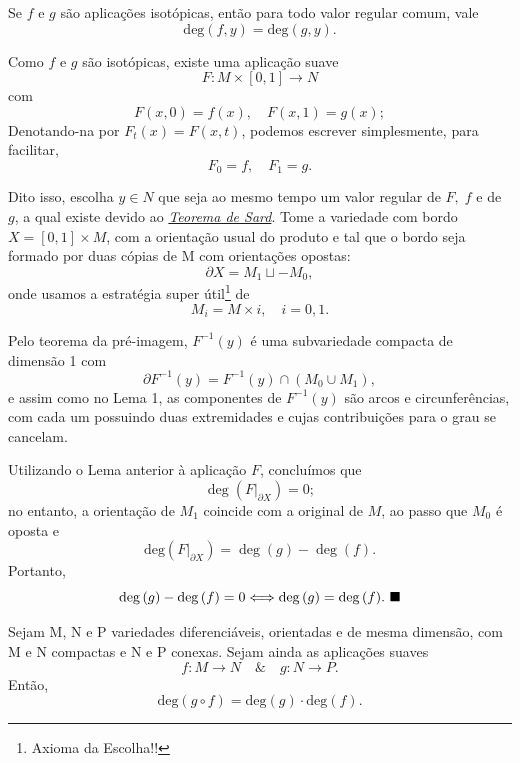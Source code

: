 \documentclass[../differential_topology.tex]{subfiles}
\begin{document}
\begin{lemma*}
	Se \(f\) e \(g\) são aplicações isotópicas, então para todo valor regular comum, vale
	\[
		\mathrm{deg}(f, y) = \mathrm{deg}(g, y).
	\]
\end{lemma*}
\begin{proof*}
	Como \(f\) e \(g\) são isotópicas, existe uma aplicação suave
	\[
		F:M\times [0, 1]\rightarrow N
	\]
	com
	\[
		F(x, 0) = f(x), \quad F(x, 1) = g(x);
	\]
	Denotando-na por \(F_{t}(x) = F(x, t)\), podemos escrever simplesmente, para facilitar,
	\[
		F_{0} = f, \quad F_{1} = g.
	\]

	Dito isso, escolha \(y\in N\) que seja ao mesmo tempo um valor regular de \(F,\; f\) e de \(g\), a qual existe devido ao \hyperlink{sard_theorem}{\textit{Teorema de Sard}}. Tome a variedade com bordo \(X = [0, 1]\times M\), com a orientação usual do produto e tal que o bordo seja formado por duas cópias de M com orientações opostas:
	\[
		\partial X = M_{1} \sqcup -M_{0},
	\]
	onde usamos a estratégia super útil\footnote{Axioma da Escolha!!} de
	\[
		M_{i} = M\times i, \quad i = 0, 1.
	\]

	Pelo teorema da pré-imagem, \(F^{-1}(y)\) é uma subvariedade compacta de dimensão 1 com
	\[
		\partial F^{-1}(y) = F^{-1}(y)\cap (M_{0}\cup M_1),
	\]
	e assim como no Lema 1, as componentes de \(F^{-1}(y)\) são arcos e circunferências, com cada um possuindo duas extremidades e cujas contribuições para o grau se cancelam.

	Utilizando o Lema anterior à aplicação \(F\), concluímos que
	\[
		\deg{(F|_{\partial X})}=0;
	\]
	no entanto, a orientação de \(M_1\) coincide com a original de \(M\), ao passo que \(M_{0}\) é oposta e
	\[
		\mathrm{deg}(F|_{\partial X}) = \deg{(g)} - \deg{(f)}.
	\]
	Portanto,
	\[
		\deg{(g)} - \deg{(f)} = 0 \Longleftrightarrow \deg{(g)} = \deg{(f)}. \text{ $\blacksquare$}
	\]
\end{proof*}
\begin{prop*}
	Sejam M, N e P variedades diferenciáveis, orientadas e de mesma dimensão, com M e N compactas e N e P conexas. Sejam ainda as aplicações suaves
	\[
		f:M\rightarrow N \quad\&\quad g:N\rightarrow P.
	\]
	Então,
	\[
		\mathrm{deg}(g\circ f) = \mathrm{deg}(g)\cdot\mathrm{deg}(f).
	\]
\end{prop*}
\end{document}
